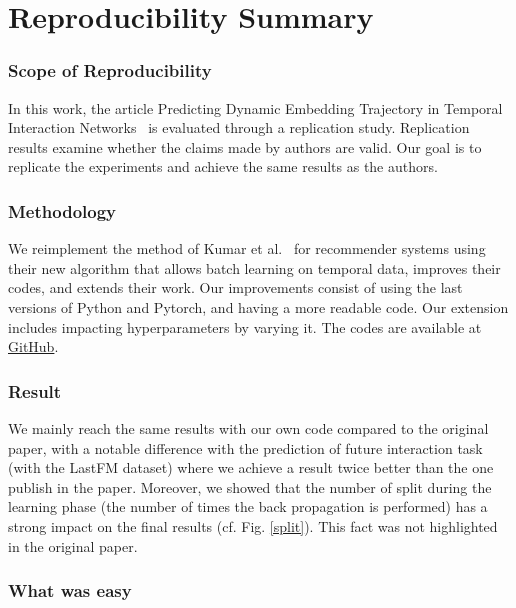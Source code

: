 

\newcommand{\amel}[1]{{\color{orange} #1}} 

\section*{Reproducibility Summary}


\subsubsection{Scope of Reproducibility}

In this work, the article Predicting Dynamic Embedding Trajectory in Temporal Interaction Networks~\cite{kumar2019predicting} is evaluated through a replication study. Replication results examine whether the claims made by authors are valid. Our goal is to replicate the experiments and achieve the same results as the authors.

\subsubsection{Methodology}

We reimplement the method of Kumar et al.~\cite{kumar2019predicting} for recommender systems using their new algorithm that allows batch learning on temporal data, improves their codes, and extends their work. Our improvements consist of using the last versions of Python and  Pytorch, and having a more readable code. Our extension includes impacting hyperparameters by varying it. The codes are available at \href{https://github.com/ComplexNetTSP/JODIE}{GitHub}. 

\subsubsection{Result}

We mainly reach the same results with our own code compared to the original paper, with a notable difference with the prediction of future interaction task (with the LastFM dataset) where we achieve a result twice better than the one publish in the paper. Moreover, we showed that the number of split during the learning phase (the number of times the back propagation is performed) has a strong impact on the final results (cf. Fig. \ref{split}). This fact was not highlighted in the original paper.

\subsubsection{What was easy}

